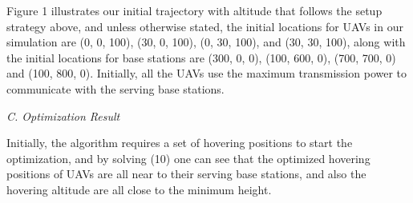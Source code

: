 \documentclass[10pt,final,conference]{IEEEtran}
\begin{document}
Figure 1 illustrates our initial trajectory with altitude that follows the setup strategy above, and unless otherwise stated, the initial locations for UAVs in our simulation are (0, 0, 100), (30, 0, 100), (0, 30, 100), and (30, 30, 100), along with the initial locations for base stations are (300, 0, 0), (100, 600, 0), (700, 700, 0) and (100, 800, 0). Initially, all the UAVs use the maximum transmission power to communicate with the serving base stations. \\ \par 

\textit{C. Optimization Result} \par 
Initially, the algorithm requires a set of hovering positions to start the optimization, and by solving (10) one can see that the optimized hovering positions of UAVs are all near to their serving base stations, and also the hovering altitude are all close to the minimum height. \par  
\end{document}
